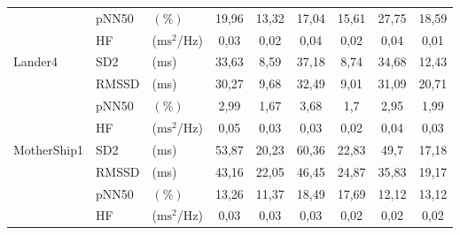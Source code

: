 \begin{table}[!htb]
\begin{threeparttable}
\begin{tabular*}{\linewidth}{@{\extracolsep{\fill}} lllcccccc @{}}
            & pNN50                                 & $(\%)$                              & 19,96                               & 13,32                               & 17,04           & 15,61       & 27,75           & 18,59       \\
            & HF                                    & ($\text{ms}^2$/Hz)                  & 0,03                                & 0,02                                & 0,04            & 0,02        & 0,04            & 0,01        \\ \midrule
            \multirow[t]{4}{*}{Lander4}     & SD2                                  & (ms)                                & 33,63                               & 8,59                                & 37,18           & 8,74        & 34,68           & 12,43       \\
            & RMSSD                                 & (ms)                                & 30,27                               & 9,68                                & 32,49           & 9,01        & 31,09           & 20,71       \\
            & pNN50                                 & $(\%)$                              & 2,99                                & 1,67                                & 3,68            & 1,7         & 2,95            & 1,99        \\
            & HF                                    & ($\text{ms}^2$/Hz)                  & 0,05                                & 0,03                                & 0,03            & 0,02        & 0,04            & 0,03        \\ \midrule
            \multirow[t]{4}{*}{MotherShip1} & SD2                                  & (ms)                                & 53,87                               & 20,23                               & 60,36           & 22,83       & 49,7            & 17,18       \\
            & RMSSD                                 & (ms)                                & 43,16                               & 22,05                               & 46,45           & 24,87       & 35,83           & 19,17       \\
            & pNN50                                 & $(\%)$                              & 13,26                               & 11,37                               & 18,49           & 17,69       & 12,12           & 13,12       \\
            & HF                                    & ($\text{ms}^2$/Hz)                  & 0,03                                & 0,03                                & 0,03            & 0,02        & 0,02            & 0,02        \\ \midrule

\end{tabular*}
\end{threeparttable}
\end{table}
